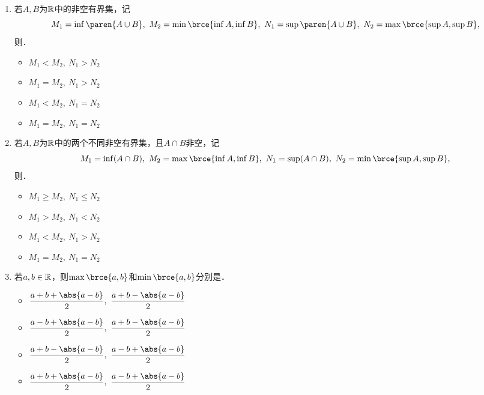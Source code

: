 \documentclass[a4paper,punct=CCT]{ctexbook}
\theoremstyle{definition}
\theoremstyle{remark}
\newif\ifshowsol
\let\leq\leqslant
\let\le\leq
\let\geq\geqslant
\let\ge\geq}
\begin{document}
\begin{enumerate}
\item 若\(A, B\)为\(\mathbb{R}\)中的非空有界集，记
  \begin{equation*}
    M_1 = \inf\paren{A \cup B},\ M_2 = \min\brce{\inf A, \inf B},\ N_1 = \sup\paren{A \cup B},\ N_2 = \max\brce{\sup A, \sup B},
  \end{equation*}
  则\uline{\hspace{8em}}．
  \begin{itemize}
    \renewcommand{\labelitemi}{\faCircleThin}
  \item \(M_1 < M_2,\ N_1 > N_2\)
  \item \(M_1 = M_2,\ N_1 > N_2\)
  \item \(M_1 < M_2,\ N_1 = N_2\)
    \ifshowsol
  \item[\faCircle] \(M_1 = M_2,\ N_1 = N_2\)
    \else
  \item \(M_1 = M_2,\ N_1 = N_2\)
    \fi
  \end{itemize}

\item 若\(A, B\)为\(\mathbb{R}\)中的两个不同非空有界集，且\(A \cap B\)非空，记
  \begin{equation*}
    M_1 = \inf(A \cap B),\ M_2 = \max\brce{\inf A, \inf B},\ N_1 = \sup(A \cap B),\ N_2 = \min\brce{\sup A, \sup B},
  \end{equation*}
  则\uline{\hspace{8em}}．
  \begin{itemize}
    \renewcommand{\labelitemi}{\faCircleThin}
    \ifshowsol
  \item[\faCircle] \(M_1 \ge M_2,\ N_1 \le N_2\)
    \else
  \item \(M_1 \ge M_2,\ N_1 \le N_2\)
    \fi
  \item \(M_1 > M_2,\ N_1 < N_2\)
  \item \(M_1 < M_2,\ N_1 > N_2\)
  \item \(M_1 = M_2,\ N_1 = N_2\)
  \end{itemize}

\item \label{B1.1.1.E9}若\(a, b \in \mathbb{R}\)，则\(\max\brce{a, b}\)和\(\min\brce{a, b}\)分别是\uline{\makebox[4em]{}}．
  \begin{itemize}
    \renewcommand{\labelitemi}{\faCircleThin}
    \ifshowsol
  \item[\faCircle] \(\displaystyle \frac{a+b+\abs{a-b}}{2},\ \frac{a+b-\abs{a-b}}{2}\)
    \else
  \item \(\displaystyle \frac{a+b+\abs{a-b}}{2},\ \frac{a+b-\abs{a-b}}{2}\)
    \fi
  \item \(\displaystyle \frac{a-b+\abs{a-b}}{2},\ \frac{a+b-\abs{a-b}}{2}\)
  \item \(\displaystyle \frac{a+b-\abs{a-b}}{2},\ \frac{a-b+\abs{a-b}}{2}\)
  \item \(\displaystyle \frac{a+b+\abs{a-b}}{2},\ \frac{a-b+\abs{a-b}}{2}\)
  \end{itemize}


\end{enumerate}
\end{document}
